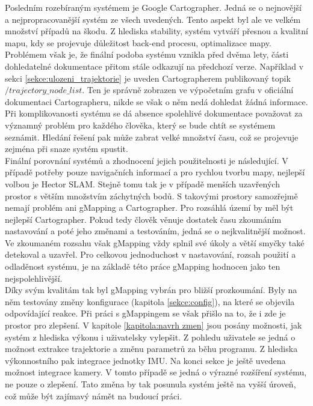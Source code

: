 \documentclass[12pt]{report}
\begin{document}
\indent Posledním rozebíraným systémem je Google Cartographer. Jedná se o nejnovější a nejpropracovanější systém ze všech uvedených. Tento aspekt byl ale ve velkém množství případů na škodu. Z hlediska stability, systém vytváří přesnou a kvalitní mapu, kdy se projevuje důležitost back-end procesu, optimalizace mapy. Problémem však je, že finální podoba systému vznikla před dvěma lety, části dohledatelné dokumentace přitom stále odkazují na předchozí verze. Například v sekci \ref{sekce:ulozeni_trajektorie} je uveden Cartographerem publikovaný topik $/trajectory\_node\_list$. Ten je správně zobrazen ve výpočetním grafu v oficiální dokumentaci Cartographeru, nikde se však o něm nedá dohledat žádná informace. Při komplikovanosti systému se dá absence spolehlivé dokumentace považovat za významný problém pro každého člověka, který se bude chtít se systémem seznámit. Hledání řešení pak může zabrat velké množství času, což se projevuje zejména při snaze systém spustit.\\
\indent Finální porovnání systémů a zhodnocení jejich použitelnosti je následující. V případě potřeby pouze navigačních informací a pro rychlou tvorbu mapy, nejlepší volbou je Hector SLAM. Stejně tomu tak je v případě menších uzavřených prostor s větším množstvím záchytných bodů. S takovými prostory samozřejmě nemají problém ani gMapping a Cartographer. Pro rozsáhlá území by měl být nejlepší Cartographer. Pokud tedy člověk věnuje dostatek času zkoumáním nastavování a poté jeho změnami a testováním, jedná se o nejkvalitnější možnost. Ve zkoumaném rozsahu však gMapping vždy splnil své úkoly a větší smyčky také detekoval a uzavřel. Pro celkovou jednoduchost v nastavování, rozsah použití a odladěnost systému, je na základě této práce gMapping hodnocen jako ten nejspolehlivější.\\
\indent Díky svým kvalitám tak byl gMapping vybrán pro bližší prozkoumání. Byly na něm testovány změny konfigurace (kapitola \ref{sekce:config}), na které se objevila odpovídající reakce. Při práci s gMappingem se však přišlo na to, že i zde je prostor pro zlepšení. V kapitole \ref{kapitola:navrh zmen} jsou posány možnosti, jak systém z hlediska výkonu i uživatelsky vylepšit. Z pohledu uživatele se jedná o možnost extrakce trajektorie a změnu parametrů za běhu programu. Z hlediska výkonnostního pak integrace jednotky IMU. Na konci sekce je ještě uvedena možnost integrace kamery. V tomto případě se jedná o výrazné rozšíření systému, ne pouze o zlepšení. Tato změna by tak posunula systém ještě na vyšší úroveň, což může být zajímavý námět na budoucí práci. 

\newpage


\end{document}
